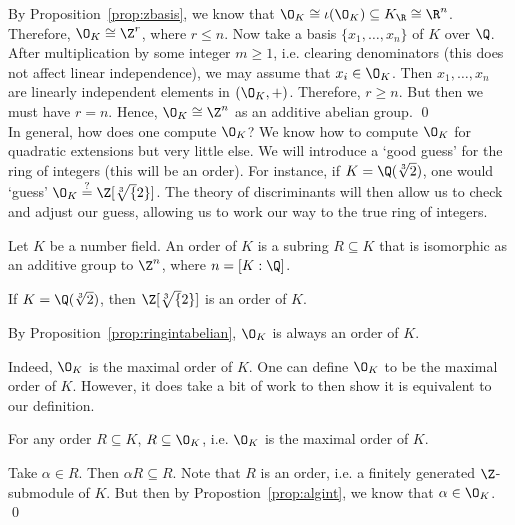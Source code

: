 \pf By Proposition~\ref{prop:zbasis}, we know that $\O_K \cong \iota(\O_K) \subseteq K_\R \cong \R^n$. Therefore, $\O_K \cong \Z^r$, where $r \leq n$. Now take a basis $\{x_1,\ldots,x_n\}$ of $K$ over $\Q$. After multiplication by some integer $m \geq 1$, i.e. clearing denominators (this does not affect linear independence), we may assume that $x_i \in \O_K$. Then $x_1,\ldots,x_n$ are linearly independent elements in $(\O_K,+)$. Therefore, $r \geq n$. But then we must have $r=n$. Hence, $\O_K \cong \Z^n$ as an additive abelian group. \qed \\




In general, how does one compute $\O_K$? We know how to compute $\O_K$ for quadratic extensions but very little else. We will introduce a `good guess' for the ring of integers (this will be an order). For instance, if $K=\Q(\sqrt[3]{2})$, one would `guess' $\O_K \stackrel{?}{=} \Z[\sqrt[3]{2}]$. The theory of discriminants will then allow us to check and adjust our guess, allowing us to work our way to the true ring of integers. 

\begin{dfn}[Order]
Let $K$ be a number field. An order of $K$ is a subring $R \subseteq K$ that is isomorphic as an additive group to $\Z^n$, where $n=[K:\Q]$. 
\end{dfn}

\begin{ex}
If $K=\Q(\sqrt[3]{2})$, then $\Z[\sqrt[3]{2}]$ is an order of $K$. \xqed
\end{ex}

\begin{ex}
By Proposition~\ref{prop:ringintabelian}, $\O_K$ is always an order of $K$. \xqed
\end{ex}

Indeed, $\O_K$ is the maximal order of $K$. One can define $\O_K$ to be the maximal order of $K$. However, it does take a bit of work to then show it is equivalent to our definition. 

\begin{lem}
For any order $R \subseteq K$, $R \subseteq \O_K$, i.e. $\O_K$ is the maximal order of $K$.
\end{lem}

\pf Take $\alpha \in R$. Then $\alpha R \subseteq R$. Note that $R$ is an order, i.e. a finitely generated $\Z$-submodule of $K$. But then by Propostion~\ref{prop:algint}, we know that $\alpha \in \O_K$. \qed \\

